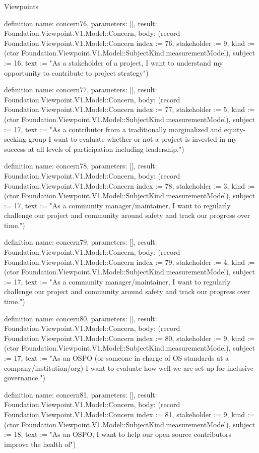 \begin{lexlean}{Viewpoints}
\begin{semanticmodule}
definition{
  name: concern76,
  parameters: [],
  result: Foundation.Viewpoint.V1.Model::Concern,
  body: (record Foundation.Viewpoint.V1.Model::Concern {index := 76, stakeholder := 9, kind := (ctor Foundation.Viewpoint.V1.Model::SubjectKind.measurementModel), subject := 16, text := "As a stakeholder of a project, I want to understand my opportunity to contribute to project strategy"})
}

definition{
  name: concern77,
  parameters: [],
  result: Foundation.Viewpoint.V1.Model::Concern,
  body: (record Foundation.Viewpoint.V1.Model::Concern {index := 77, stakeholder := 5, kind := (ctor Foundation.Viewpoint.V1.Model::SubjectKind.measurementModel), subject := 17, text := "As a contributor from a traditionally marginalized and equity-seeking group I want to evaluate whether or not a project is invested in my success at all levels of participation including leadership."})
}

definition{
  name: concern78,
  parameters: [],
  result: Foundation.Viewpoint.V1.Model::Concern,
  body: (record Foundation.Viewpoint.V1.Model::Concern {index := 78, stakeholder := 3, kind := (ctor Foundation.Viewpoint.V1.Model::SubjectKind.measurementModel), subject := 17, text := "As a community manager/maintainer, I want to regularly challenge our project and community around safety and track our progress over time."})
}

definition{
  name: concern79,
  parameters: [],
  result: Foundation.Viewpoint.V1.Model::Concern,
  body: (record Foundation.Viewpoint.V1.Model::Concern {index := 79, stakeholder := 4, kind := (ctor Foundation.Viewpoint.V1.Model::SubjectKind.measurementModel), subject := 17, text := "As a community manager/maintainer, I want to regularly challenge our project and community around safety and track our progress over time."})
}

definition{
  name: concern80,
  parameters: [],
  result: Foundation.Viewpoint.V1.Model::Concern,
  body: (record Foundation.Viewpoint.V1.Model::Concern {index := 80, stakeholder := 9, kind := (ctor Foundation.Viewpoint.V1.Model::SubjectKind.measurementModel), subject := 17, text := "As an OSPO (or someone in charge of OS standards at a company/institution/org) I want to evaluate how well we are set up for inclusive governance."})
}

definition{
  name: concern81,
  parameters: [],
  result: Foundation.Viewpoint.V1.Model::Concern,
  body: (record Foundation.Viewpoint.V1.Model::Concern {index := 81, stakeholder := 9, kind := (ctor Foundation.Viewpoint.V1.Model::SubjectKind.measurementModel), subject := 18, text := "As an OSPO, I want to help our open source contributors improve the health of"})
}


\end{semanticmodule}
\end{lexlean}
